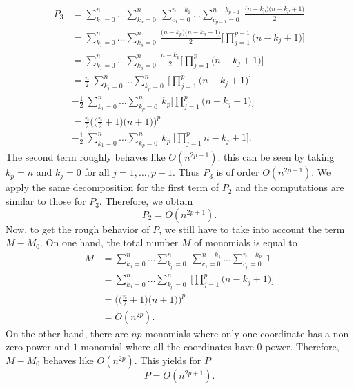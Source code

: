 \documentclass[anon,12pt]{colt2021} %
\begin{document}
\begin{align*}
    P_{3} &= \sum_{k_{1}=0}^{n} \dots \sum_{k_{p}=0}^{n} \ \sum_{c_{1}=0}^{n-k_{1}} \dots \sum_{c_{p-1}=0}^{n-k_{p-1}} \ \frac{\big( n -k_{p} \big) \big( n-k_{p} + 1 \big)}{2} \\
    &= \sum_{k_{1}=0}^{n} \dots \sum_{k_{p}=0}^{n} \ \frac{\big( n -k_{p} \big) \big( n-k_{p} + 1 \big)}{2} \bigg[ \prod_{j=1}^{p-1} \big( n-k_{j} + 1 \big) \bigg] \\
    &= \sum_{k_{1}=0}^{n} \dots \sum_{k_{p}=0}^{n} \ \frac{n -k_{p} }{2} \bigg[ \prod_{j=1}^{p} \big( n-k_{j} + 1 \big) \bigg] \\
    &= \frac{n}{2} \ \sum_{k_{1}=0}^{n} \dots \sum_{k_{p}=0}^{n} \ \bigg[ \prod_{j=1}^{p} \big( n-k_{j} + 1 \big) \bigg] \\
    &- \frac{1}{2} \ \sum_{k_{1}=0}^{n} \dots \sum_{k_{p}=0}^{n} \ k_{p} \bigg[ \prod_{j=1}^{p} \big( n-k_{j} + 1 \big) \bigg] \\
    &= \frac{n}{2} \bigg( \bigg( \frac{n}{2} + 1 \bigg) \big( n+1 \big) \bigg)^{p} \\
    &- \frac{1}{2} \ \sum_{k_{1}=0}^{n} \dots \sum_{k_{p}=0}^{n} \ k_{p} \ \bigg[ \prod_{j=1}^{p} n - k_{j} + 1 \bigg].
\end{align*}
The second term roughly behaves like $O(n^{2p-1})$: this can be seen by taking $k_{p} = n$ and $k_{j}=0$ for all $j=1, \dots, p-1$. Thus $P_{3}$ is of order $O(n^{2p+1})$. We apply the same decomposition for the first term of $P_{2}$ and the computations are similar to those for $P_{3}$. Therefore, we obtain
\begin{equation*}
    P_{2} = O(n^{2p+1}).
\end{equation*}
Now, to get the rough behavior of $P$, we still have to take into account the term $M-M_{0}$. On one hand, the total number $M$ of monomials is equal to
\begin{align*}
    M &= \sum_{k_{1}=0}^{n} \dots \sum_{k_{p}=0}^{n} \ \sum_{c_{1}=0}^{n-k_{1}} \dots \sum_{c_{p}=0}^{n-k_{p}} \ 1 \\
    &= \sum_{k_{1}=0}^{n} \dots \sum_{k_{p}=0}^{n} \ \bigg[ \prod_{j=1}^{p} \big( n -k_{j} + 1 \big) \bigg] \\
    &= \bigg( \bigg( \frac{n}{2} + 1 \bigg) \big( n + 1\big) \bigg)^{p} \\
    &= O(n^{2p}).
\end{align*}
On the other hand, there are $np$ monomials where only one coordinate has a non zero power and $1$ monomial where all the coordinates have $0$ power. Therefore, $M-M_{0}$ behaves like $O(n^{2p})$. This yields for $P$
\begin{equation*}
    P = O(n^{2p+1}).
\end{equation*}
\end{document}
